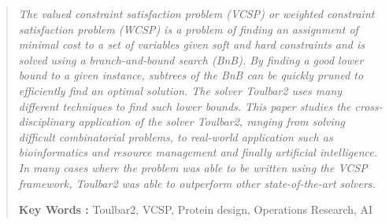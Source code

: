 \documentclass[a4paper]{article}
\begin{document}




\clearpage
\thispagestyle{plain}
\vspace*{\fill}

\begin{abstract}
    \centering
    \itshape
    \justify
    The valued constraint satisfaction problem (VCSP) or weighted constraint satisfaction problem (WCSP) is a problem of finding an assignment of minimal cost to a set of variables given soft and hard constraints and is solved using a branch-and-bound search (BnB). By finding a good lower bound to a given instance, subtrees of the BnB can be quickly pruned to efficiently find an optimal solution. The solver Toulbar2 uses many different techniques to find such lower bounds. This paper studies the cross-disciplinary application of the solver Toulbar2, ranging from solving difficult combinatorial problems, to real-world application such as bioinformatics and resource management and finally artificial intelligence. In many cases where the problem was able to be written using the VCSP framework, Toulbar2 was able to outperform other state-of-the-art solvers.
    
    \vspace{0.5cm}
    \noindent \textbf{Key Words :} Toulbar2, VCSP, Protein design, Operations Research, AI
\end{abstract}

\vspace*{\fill}


\clearpage
\tableofcontents

\clearpage
\listoffigures


\clearpage
\end{document}
